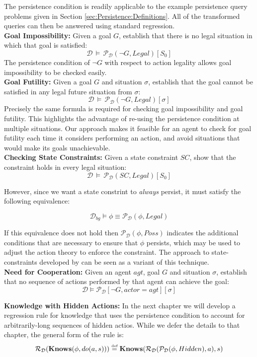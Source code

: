 The persistence condition is readily applicable to the example persistence
query problems given in Section \ref{sec:Persistence:Definitions}.
All of the transformed queries can then be answered using standard
regression.\\


\textbf{Goal Impossibility:} Given a goal $G$, establish that there
is no legal situation in which that goal is satisfied:\[
\mathcal{D\,}\models\,\mathcal{P_{D}}(\neg G,Legal)[S_{0}]\]
 The persistence condition of $\neg G$ with respect to action legality
allows goal impossibility to be checked easily.\\


\textbf{Goal Futility:} Given a goal $G$ and situation $\sigma$,
establish that the goal cannot be satisfied in any legal future situation
from $\sigma$:\[
\mathcal{D}\,\models\,\mathcal{P_{D}}(\neg G,Legal)[\sigma]\]
 Precisely the same formula is required for checking goal impossibility
and goal futility. This highlights the advantage of re-using the persistence
condition at multiple situations. Our approach makes it feasible for
an agent to check for goal futility each time it considers performing
an action, and avoid situations that would make its goals unachievable.\\


\textbf{Checking State Constraints:} Given a state constraint $SC$,
show that the constraint holds in every legal situation:\[
\mathcal{D}\,\models\,\mathcal{P_{D}}(SC,Legal)[S_{0}]\]


However, since we want a state constrint to \emph{always} persist,
it must satisfy the following equivalence:

\[
\mathcal{D}_{bg}\models\phi\equiv\mathcal{P}_{\mathcal{D}}(\phi,Legal)\]


If this equivalence does not hold then $\mathcal{P}_{\mathcal{D}}(\phi,Poss)$
indicates the additional conditions that are necessary to ensure that
$\phi$ persists, which may be used to adjust the action theory to
enforce the constraint. The approach to state-constraints developed
by \citet{Lin94-StateConstraints} can be seen as a variant of this
technique.\\


\textbf{Need for Cooperation:} Given an agent $agt$, goal $G$ and
situation $\sigma$, establish that no sequence of actions performed
by that agent can achieve the goal:\[
\mathcal{D}\models\mathcal{P_{D}}[\neg G,actor=agt][\sigma]\]


\textbf{Knowledge with Hidden Actions:} In the next chapter we will
develop a regression rule for knowledge that uses the persistence
condition to account for arbitrarily-long sequences of hidden actios.
While we defer the details to that chapter, the general form of the
rule is:\[
\mathcal{R}_{\mathcal{D}}(\mathbf{Knows}(\phi,do(a,s)))\stackrel{\mbox{\tiny def}}{=}\mathbf{Knows}(\mathcal{R}_{\mathcal{D}}(\mathcal{P}_{\mathcal{D}}(\phi,Hidden),a),s)\]



